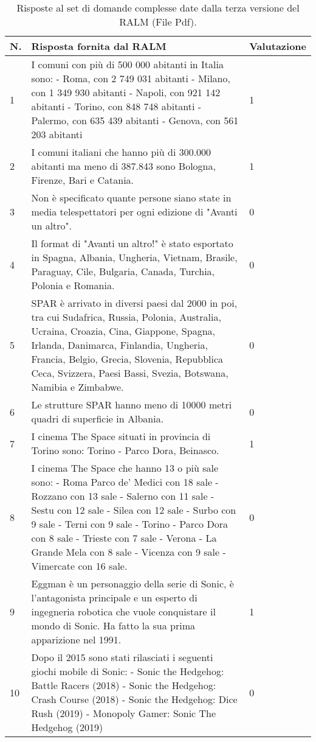 \begin{table}[H]
    \centering
    \begin{tabular}{|p{0.5cm} |p{6cm} |p{2cm}|}
        \hline
        \textbf{N}. & \textbf{Risposta fornita dal RALM} & \textbf{Valutazione} \\
        \hline
        1 & I comuni con più di 500 000 abitanti in Italia sono: 
        - Roma, con 2 749 031 abitanti 
        - Milano, con 1 349 930 abitanti 
        - Napoli, con 921 142 abitanti 
        - Torino, con 848 748 abitanti 
        - Palermo, con 635 439 abitanti 
        - Genova, con 561 203 abitanti & 1 \\
        \hline
        2 & I comuni italiani che hanno più di 300.000 abitanti ma meno di 387.843 sono Bologna, Firenze, Bari e Catania. & 1 \\
        \hline
        3 & Non è specificato quante persone siano state in media telespettatori per ogni edizione di "Avanti un altro". & 0 \\
        \hline
        4 & Il format di "Avanti un altro!" è stato esportato in Spagna, Albania, Ungheria, Vietnam, Brasile, Paraguay, Cile, Bulgaria, Canada, Turchia, Polonia e Romania. & 0 \\
        \hline
        5 & SPAR è arrivato in diversi paesi dal 2000 in poi, tra cui Sudafrica, Russia, Polonia, Australia, Ucraina, Croazia, Cina, Giappone, Spagna, Irlanda, Danimarca, Finlandia, Ungheria, Francia, Belgio, Grecia, Slovenia, Repubblica Ceca, Svizzera, Paesi Bassi, Svezia, Botswana, Namibia e Zimbabwe. & 0 \\
        \hline
        6 & Le strutture SPAR hanno meno di 10000 metri quadri di superficie in Albania. & 0 \\
        \hline
        7 & I cinema The Space situati in provincia di Torino sono: Torino - Parco Dora, Beinasco. & 1 \\
        \hline
        8 & I cinema The Space che hanno 13 o più sale sono:
        - Roma Parco de' Medici con 18 sale
        - Rozzano con 13 sale
        - Salerno con 11 sale
        - Sestu con 12 sale
        - Silea con 12 sale
        - Surbo con 9 sale
        - Terni con 9 sale
        - Torino - Parco Dora con 8 sale
        - Trieste con 7 sale
        - Verona - La Grande Mela con 8 sale
        - Vicenza con 9 sale
        - Vimercate con 16 sale. & 0 \\
        \hline
        9 & Eggman è un personaggio della serie di Sonic, è l'antagonista principale e un esperto di ingegneria robotica che vuole conquistare il mondo di Sonic. Ha fatto la sua prima apparizione nel 1991. & 1 \\
        \hline
        10 & Dopo il 2015 sono stati rilasciati i seguenti giochi mobile di Sonic:
        - Sonic the Hedgehog: Battle Racers (2018)
        - Sonic the Hedgehog: Crash Course (2018)
        - Sonic the Hedgehog: Dice Rush (2019)
        - Monopoly Gamer: Sonic The Hedgehog (2019) & 0 \\
        \hline
    \end{tabular}
    \caption{Risposte al set di domande complesse date dalla terza versione del RALM (File Pdf).}
\end{table}

